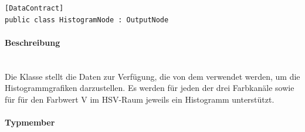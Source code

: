 \begin{verbatim}
[DataContract]
public class HistogramNode : OutputNode
\end{verbatim}
\paragraph{Beschreibung}~\\
Die Klasse  stellt die Daten zur Verfügung, die von dem  verwendet werden, um die Histogrammgrafiken darzustellen. Es werden für jeden der drei Farbkanäle sowie für für den Farbwert V im HSV-Raum jeweils ein Histogramm unterstützt.

\paragraph{Typmember}
